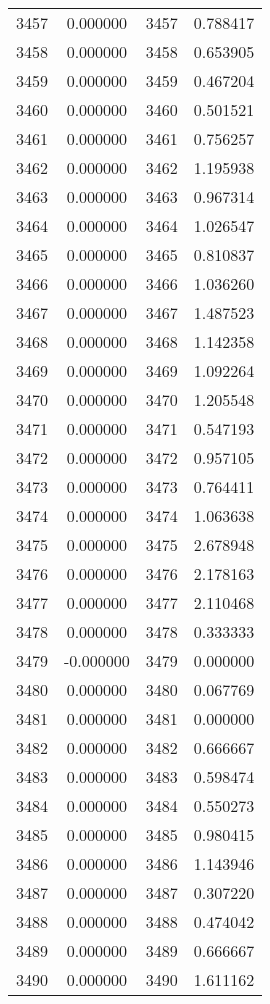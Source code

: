\documentclass[12pt]{article}
\begin{document}
\begin{longtable}{@{}cccc@{}}
3457 & 0.000000 & 3457 & 0.788417 \\
3458 & 0.000000 & 3458 & 0.653905 \\
3459 & 0.000000 & 3459 & 0.467204 \\
3460 & 0.000000 & 3460 & 0.501521 \\
3461 & 0.000000 & 3461 & 0.756257 \\
3462 & 0.000000 & 3462 & 1.195938 \\
3463 & 0.000000 & 3463 & 0.967314 \\
3464 & 0.000000 & 3464 & 1.026547 \\
3465 & 0.000000 & 3465 & 0.810837 \\
3466 & 0.000000 & 3466 & 1.036260 \\
3467 & 0.000000 & 3467 & 1.487523 \\
3468 & 0.000000 & 3468 & 1.142358 \\
3469 & 0.000000 & 3469 & 1.092264 \\
3470 & 0.000000 & 3470 & 1.205548 \\
3471 & 0.000000 & 3471 & 0.547193 \\
3472 & 0.000000 & 3472 & 0.957105 \\
3473 & 0.000000 & 3473 & 0.764411 \\
3474 & 0.000000 & 3474 & 1.063638 \\
3475 & 0.000000 & 3475 & 2.678948 \\
3476 & 0.000000 & 3476 & 2.178163 \\
3477 & 0.000000 & 3477 & 2.110468 \\
3478 & 0.000000 & 3478 & 0.333333 \\
3479 & -0.000000 & 3479 & 0.000000 \\
3480 & 0.000000 & 3480 & 0.067769 \\
3481 & 0.000000 & 3481 & 0.000000 \\
3482 & 0.000000 & 3482 & 0.666667 \\
3483 & 0.000000 & 3483 & 0.598474 \\
3484 & 0.000000 & 3484 & 0.550273 \\
3485 & 0.000000 & 3485 & 0.980415 \\
3486 & 0.000000 & 3486 & 1.143946 \\
3487 & 0.000000 & 3487 & 0.307220 \\
3488 & 0.000000 & 3488 & 0.474042 \\
3489 & 0.000000 & 3489 & 0.666667 \\
3490 & 0.000000 & 3490 & 1.611162 \\

\end{longtable}
\end{document}

